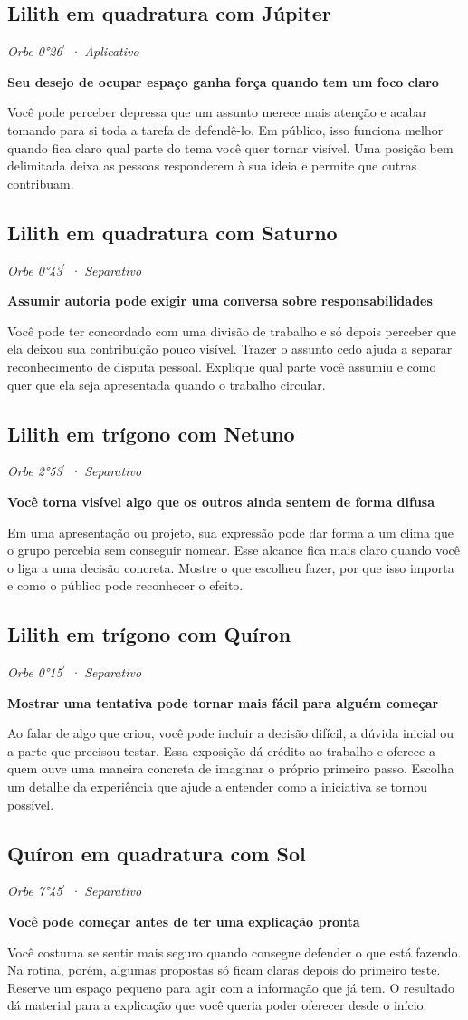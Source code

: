 \documentclass[11pt,a4paper]{article}
\newcommand{\leitura}[3]{\subsection{#1}\textit{#2}\par #3}
\newcommand{\subtituloleitura}[1]{\textbf{#1}\par\nopagebreak[4]}
\begin{document}
\leitura{Lilith em quadratura com Júpiter}{Orbe 0°26\ensuremath{^{\prime}} · Aplicativo}{
\label{aspecto:lilith-jupiter}\subtituloleitura{Seu desejo de ocupar espaço ganha força quando tem um foco claro}
Você pode perceber depressa que um assunto merece mais atenção e acabar tomando para si toda a tarefa de defendê-lo. Em público, isso funciona melhor quando fica claro qual parte do tema você quer tornar visível. Uma posição bem delimitada deixa as pessoas responderem à sua ideia e permite que outras contribuam.
}

\leitura{Lilith em quadratura com Saturno}{Orbe 0°43\ensuremath{^{\prime}} · Separativo}{
\label{aspecto:lilith-saturno}\subtituloleitura{Assumir autoria pode exigir uma conversa sobre responsabilidades}
Você pode ter concordado com uma divisão de trabalho e só depois perceber que ela deixou sua contribuição pouco visível. Trazer o assunto cedo ajuda a separar reconhecimento de disputa pessoal. Explique qual parte você assumiu e como quer que ela seja apresentada quando o trabalho circular.
}

\leitura{Lilith em trígono com Netuno}{Orbe 2°53\ensuremath{^{\prime}} · Separativo}{
\subtituloleitura{Você torna visível algo que os outros ainda sentem de forma difusa}
Em uma apresentação ou projeto, sua expressão pode dar forma a um clima que o grupo percebia sem conseguir nomear. Esse alcance fica mais claro quando você o liga a uma decisão concreta. Mostre o que escolheu fazer, por que isso importa e como o público pode reconhecer o efeito.
}

\leitura{Lilith em trígono com Quíron}{Orbe 0°15\ensuremath{^{\prime}} · Separativo}{
\label{aspecto:lilith-quiron}\subtituloleitura{Mostrar uma tentativa pode tornar mais fácil para alguém começar}
Ao falar de algo que criou, você pode incluir a decisão difícil, a dúvida inicial ou a parte que precisou testar. Essa exposição dá crédito ao trabalho e oferece a quem ouve uma maneira concreta de imaginar o próprio primeiro passo. Escolha um detalhe da experiência que ajude a entender como a iniciativa se tornou possível.
}

\leitura{Quíron em quadratura com Sol}{Orbe 7°45\ensuremath{^{\prime}} · Separativo}{
\subtituloleitura{Você pode começar antes de ter uma explicação pronta}
Você costuma se sentir mais seguro quando consegue defender o que está fazendo. Na rotina, porém, algumas propostas só ficam claras depois do primeiro teste. Reserve um espaço pequeno para agir com a informação que já tem. O resultado dá material para a explicação que você queria poder oferecer desde o início.
}
\end{document}
